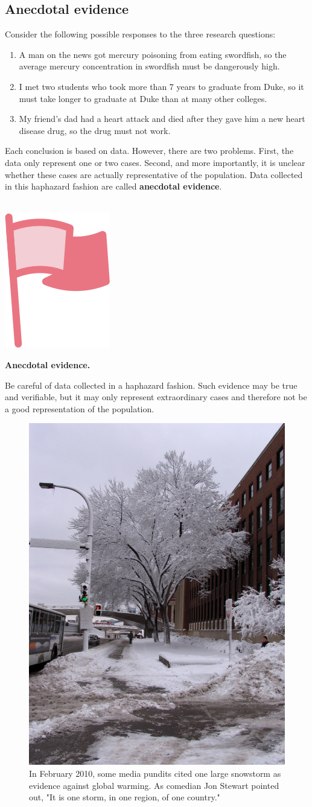 \documentclass[
  10pt,
  openany]{book}
\providecommand{\tightlist}{%
  \setlength{\itemsep}{0pt}\setlength{\parskip}{0pt}}
\newenvironment{mdframedwithfootImportant}
{   
    \savenotes
    \begin{mdframed}[%
    topline=true, bottomline=true, linecolor=oiR, linewidth=0.5pt,
    rightline=false, leftline=false,
    backgroundcolor=oiLGray]
    \renewcommand{\thempfootnote}{\arabic{footnote}}
    }
{
    \end{mdframed}
    \spewnotes
}
\newenvironment{important}{
    \let\oldtextbf\textbf
    \renewcommand{\textbf}[1]{{\textcolor{oiR}{\oldtextbf{##1}}}}
\vspace{4mm}
\begin{mdframedwithfootImportant}
\begin{minipage}[t]{0.10\textwidth}
{$\:$ \\ \setkeys{Gin}{width=2.5em,keepaspectratio}\includegraphics{images/_icons/important.png}}
\end{minipage}
\hfill
\begin{minipage}[t]{0.90\textwidth}
\vspace{-2mm}
\setlength{\parskip}{1em}
}{\end{minipage}
\end{mdframedwithfootImportant}
\vspace{4mm}
}
\begin{document}
\hypertarget{anecdotal-evidence}{%
\subsection{Anecdotal evidence}\label{anecdotal-evidence}}


Consider the following possible responses to the three research questions:

\begin{enumerate}
\def\labelenumi{\arabic{enumi}.}
\tightlist
\item
  A man on the news got mercury poisoning from eating swordfish, so the average mercury concentration in swordfish must be dangerously high.
\item
  I met two students who took more than 7 years to graduate from Duke, so it must take longer to graduate at Duke than at many other colleges.
\item
  My friend's dad had a heart attack and died after they gave him a new heart disease drug, so the drug must not work.
\end{enumerate}

Each conclusion is based on data.
However, there are two problems.
First, the data only represent one or two cases.
Second, and more importantly, it is unclear whether these cases are actually representative of the population.
Data collected in this haphazard fashion are called \textbf{anecdotal evidence}.

\begin{important}
\textbf{Anecdotal evidence.}

Be careful of data collected in a haphazard fashion.
Such evidence may be true and verifiable, but it may only represent extraordinary cases and therefore not be a good representation of the population.

\end{important}

\begin{figure}[h]

{\centering \includegraphics[width=0.35\linewidth]{images/mn-winter/mn-winter} 

}

\caption{In February 2010, some media pundits cited one large snowstorm as evidence against global warming. As comedian Jon Stewart pointed out, "It is one storm, in one region, of one country."}\label{fig:mn-winter}
\end{figure}
\end{document}
